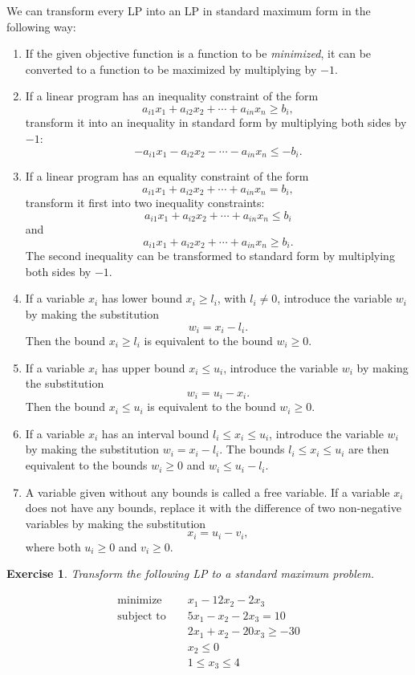 \documentclass[letterpaper,10pt]{article}
\newtheorem{ex}{Exercise}
\begin{document}
We can transform every LP into an LP in standard maximum form in the following way:

\begin{enumerate}

\item If the given objective function is a function to be {\em minimized}, it can be converted to a function to be maximized by multiplying by $-1$. 

\item If a linear program has an inequality constraint of the form $$a_{i1}x_1+a_{i2}x_2+\cdots+a_{in}x_n\geq b_i,$$ transform it into an inequality in standard form by multiplying both sides by $-1$:  $$-a_{i1}x_1-a_{i2}x_2-\cdots-a_{in}x_n\leq -b_i.$$

\item If a linear program has an equality constraint of the form $$a_{i1}x_1+a_{i2}x_2+\cdots+a_{in}x_n= b_i,$$ transform it first into two inequality constraints:  $$a_{i1}x_1+a_{i2}x_2+\cdots+a_{in}x_n\leq b_i$$ and $$a_{i1}x_1+a_{i2}x_2+\cdots+a_{in}x_n\geq b_i.$$  The second inequality can be transformed to standard form by multiplying both sides by $-1$.

\item If a variable $x_i$ has lower bound $x_i\geq l_i$, with $l_i\neq 0$, introduce the variable $w_i$ by making the substitution $$w_i=x_i-l_i.$$  Then the bound $x_i\geq l_i$ is equivalent to the bound $w_i\geq 0$.

\item If a variable $x_i$ has upper bound $x_i\leq u_i$, introduce the variable $w_i$ by making the substitution $$w_i=u_i-x_i.$$  Then the bound $x_i\leq u_i$ is equivalent to the bound $w_i\geq 0$.

\item If a variable $x_i$ has an interval bound $l_i\leq x_i\leq u_i$, introduce the variable $w_i$ by making the substitution $w_i=x_i-l_i$.  The bounds $l_i\leq x_i\leq u_i$ are then equivalent to the bounds $ w_i\geq 0$ and $w_i\leq u_i-l_i$.

\item A variable given without any bounds is called a free variable.  If a variable $x_i$ does not have any bounds, replace it with the difference of two non-negative variables by making the substitution $$x_i=u_i-v_i,$$ where both $u_i\geq 0$ and $v_i\geq 0$.

\end{enumerate}

\begin{ex}
Transform the following LP to a standard maximum problem.

\begin{eqnarray*}
\text{minimize }&&x_1-12x_2-2x_3\\
\text{subject to }&&5x_1-x_2-2x_3=10\\
&&2x_1+x_2-20x_3\geq -30\\
&&x_2\leq 0\\
&& 1\leq x_3\leq 4\\
\end{eqnarray*}

\end{ex}
\end{document}
